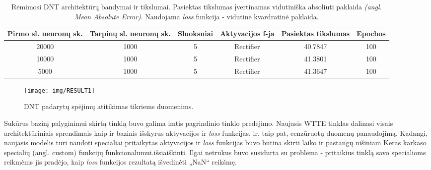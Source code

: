 \documentclass{VUMIFPSkursinis}
\begin{document}
\begin{table}[H]\footnotesize
  \centering
  \caption{ Rėmimosi DNT architektūrų bandymai ir tikslumai. Pasiektas tikslumas įvertinamas vidutiniška absoliuti paklaida \textit{(angl. Mean Absolute Error)}. Naudojama \textit{loss} funkcija - vidutinė kvardratinė paklaida.}
  {\begin{tabular}{|c|c|c|c|c|c|} \hline
    Pirmo sl. neuronų sk. & Tarpinų sl. neuronų sk. & Sluoksniai & Aktyvacijos f-ja & Pasiektas tikslumas & Epochos \\
    \hline
    20000 & 1000 & 5  &   Rectifier  & 40.7847  & 100 \\
    \hline
    10000 & 1000 & 5  &   Rectifier  & 41.3801  & 100 \\
    \hline
    5000 & 1000 & 5  &   Rectifier  & 41.3647  & 100 \\
    \hline
  \end{tabular}}
  \label{tab:table example}
\end{table}

\begin{figure}[H]
  \centering
  \texttt{[image: img/RESULT1]}
  \caption{ DNT padarytų spėjimų atitikimas tikriems duomenims. }
  \label{img:RESULT1}
\end{figure}

Sukūrus bazinį palyginimui skirtą tinklą buvo galima imtis pagrindinio tinklo predėjimo. Naujasis WTTE tinklas dalinasi visais architektūriniais sprendimais kaip ir bazinis išskyrus aktyvacijos ir \textit{loss} funkcijas, ir, taip pat, cenzūruotų duomenų panaudojimą. Kadangi, naujasis modelis turi naudoti specialiai pritaikytas aktyvacijos ir \textit{loss} funkcijas buvo būtina skirti laiko ir pastangų nišiniam Keras karkaso specialių (angl. custom) funkcijų funkcionalumui.išsiaiškinti. Ilgai netrukus buvo susidurta su problema - pritaikius tinklą savo specialioms reikmėms jis pradėjo, kaip \textit{loss} funkcijos rezultatą išvedinėti „NaN“ reikšmę. 



\printbibliography[heading=bibintoc]  %
\end{document}
